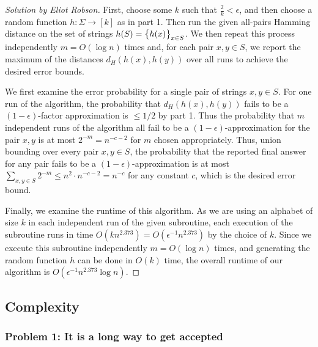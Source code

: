 \documentclass{article}
\newenvironment{solution}[1]{\begin{proof}[Solution by #1]}{\end{proof}}
\begin{document}
\begin{enumerate}
	\begin{solution}{Eliot Robson}
		First, choose some \(k\) such that \(\frac{2}{k} < \epsilon\), and then choose a random function \(h : \Sigma \to [k]\) as in part 1. Then run the given all-pairs Hamming distance on the set of strings \(h(S) = \set{h(x)}_{x \in S}\). We then repeat this process independently \(m = O(\log n)\) times and, for each pair \(x,y \in S\), we report the maximum of the distances \(d_H(h(x), h(y))\) over all runs to achieve the desired error bounds.
		
		We first examine the error probability for a single pair of strings \(x, y \in S\). For one run of the algorithm, the probability that \(d_H (h(x), h(y))\) fails to be a \((1 - \epsilon)\)-factor approximation is \(\leq 1/2\) by part 1. Thus the probability that \(m\) independent runs of the algorithm all fail to be a \((1 - \epsilon)\)-approximation for the pair \(x,y\) is at most \(2^{-m} = n^{-c-2}\) for \(m\) chosen appropriately. Thus, union bounding over every pair \(x,y \in S\), the probability that the reported final answer for any pair fails to be a \((1 - \epsilon)\)-approximation is at most \(\sum_{x,y \in S} 2^{-m} \leq n^{2} \cdot n^{-c - 2} = n^{-c}\) for any constant \(c\), which is the desired error bound.
		
		Finally, we examine the runtime of this algorithm. As we are using an alphabet of size \(k\) in each independent run of the given subroutine, each execution of the subroutine runs in time \(O(k n^{2.373}) = O(\epsilon^{-1} n^{2.373})\) by the choice of \(k\). Since we execute this subroutine independently \(m = O(\log n)\) times, and generating the random function \(h\) can be done in \(O(k)\) time, the overall runtime of our algorithm is \(O(\epsilon^{-1} n^{2.373} \log n)\).
	\end{solution}
\end{enumerate}


\subsection{Complexity}

\subsubsection{Problem 1: It is a long way to get accepted}
\end{document}
